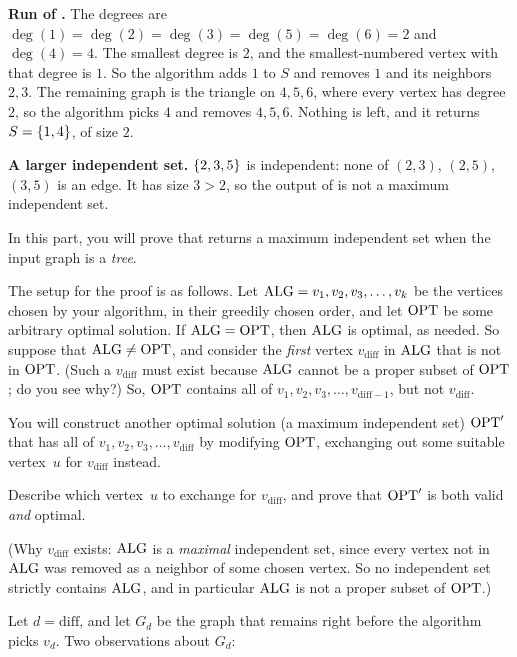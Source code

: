 \documentclass[11pt,addpoints,answers]{exam}
\begin{document}
\begin{questions}
\begin{parts}
\begin{solution}
      \textbf{Run of .}
      The degrees are $\deg(1)=\deg(2)=\deg(3)=\deg(5)=\deg(6)=2$ and $\deg(4)=4$.
      The smallest degree is $2$, and the smallest-numbered vertex with that degree is $1$.
      So the algorithm adds $1$ to $S$ and removes $1$ and its neighbors $2,3$.
      The remaining graph is the triangle on $4,5,6$, where every vertex has degree $2$, so the algorithm picks $4$ and removes $4,5,6$.
      Nothing is left, and it returns $S = \left\{1,4\right\}$, of size $2$.

      \textbf{A larger independent set.}
      $\left\{2,3,5\right\}$ is independent: none of $(2,3)$, $(2,5)$, $(3,5)$ is an edge.
      It has size $3 > 2$, so the output of  is not a maximum independent set.
    \end{solution}

    
    \bonuspart[2] In this part, you will prove that  returns a maximum independent set when the input graph is a \emph{tree}.

    The setup for the proof is as follows.
    Let $\mathrm{ALG}=v_1,v_2,v_3,\dots,v_k$ be the vertices chosen by your algorithm, in their greedily chosen order, and let $\mathrm{OPT}$ be some arbitrary optimal solution.
    If $\mathrm{ALG} = \mathrm{OPT}$, then $\mathrm{ALG}$ is optimal, as needed.
    So suppose that $\mathrm{ALG} \neq \mathrm{OPT}$, and consider the \emph{first} vertex $v_{\text{diff}}$ in $\mathrm{ALG}$ that is not in $\mathrm{OPT}$.
    (Such a $v_{\text{diff}}$ must exist because $\mathrm{ALG}$ cannot be a proper subset of $\mathrm{OPT}$; do you see why?)
    So, $\mathrm{OPT}$ contains all of $v_1,v_2,v_3,\dots,v_{\text{diff}-1}$, but not $v_{\text{diff}}$.
    
    You will construct another optimal solution (a maximum independent set) $\mathrm{OPT}'$ that has all of $v_1,v_2,v_3,\ldots,v_{\text{diff}}$ by modifying $\mathrm{OPT}$, exchanging out some suitable vertex~$u$ for $v_{\text{diff}}$ instead.

    Describe which vertex~$u$ to exchange for $v_\text{diff}$, and prove that $\mathrm{OPT}'$ is both valid \textit{and} optimal.

    \begin{solution}
      (Why $v_{\text{diff}}$ exists: $\mathrm{ALG}$ is a \emph{maximal} independent set, since every vertex not in $\mathrm{ALG}$ was removed as a neighbor of some chosen vertex.
      So no independent set strictly contains $\mathrm{ALG}$, and in particular $\mathrm{ALG}$ is not a proper subset of $\mathrm{OPT}$.)

      Let $d = \text{diff}$, and let $G_d$ be the graph that remains right before the algorithm picks $v_d$.
      Two observations about $G_d$:


\end{solution}
\end{parts}
\end{questions}
\end{document}
